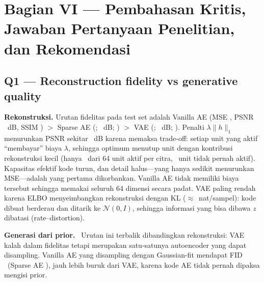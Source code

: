 \section{Bagian VI --- Pembahasan Kritis, Jawaban Pertanyaan Penelitian, dan Rekomendasi}

\subsection*{Q1 --- Reconstruction fidelity vs generative quality}
\textbf{Rekonstruksi.} Urutan fidelitas pada test set adalah Vanilla AE (MSE \MSEAE, PSNR \PSNRAE\ dB, SSIM \SSIMAE)
$>$ Sparse AE (\MSESAE; \PSNRSAE\ dB; \SSIMSAE) $>$ VAE (\MSEVAE; \PSNRVAE\ dB; \SSIMVAE). Penalti $\lambda\lVert h\rVert_1$
menurunkan PSNR sekitar \PSNRdropSAE\ dB karena memaksa trade-off: setiap unit yang aktif ``membayar'' biaya $\lambda$, sehingga
optimum menutup unit dengan kontribusi rekonstruksi kecil (hanya \ACTSAE\ dari 64 unit aktif per citra, \DEADSAE\ unit tidak
pernah aktif). Kapasitas efektif kode turun, dan detail halus---yang hanya sedikit menurunkan MSE---adalah yang pertama
dikorbankan. Vanilla AE tidak memiliki biaya tersebut sehingga memakai seluruh 64 dimensi secara padat. VAE paling rendah
karena ELBO menyeimbangkan rekonstruksi dengan KL ($\approx$\KLVAE\ nat/sampel): kode dibuat berderau dan ditarik ke
$\mathcal{N}(0,I)$, sehingga informasi yang bisa dibawa $z$ dibatasi (rate--distortion).

\textbf{Generasi dari prior.} \QoneFID\ Urutan ini terbalik dibandingkan rekonstruksi: VAE kalah dalam fidelitas tetapi
merupakan satu-satunya autoencoder yang dapat disampling. Vanilla AE yang disampling dengan Gaussian-fit mendapat FID
\FIDaegauss\ (Sparse AE \FIDsaegauss), jauh lebih buruk dari VAE, karena kode AE tidak pernah dipaksa mengisi prior.

